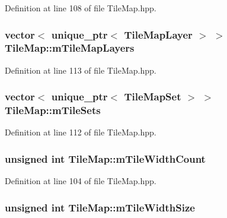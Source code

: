 Definition at line 108 of file Tile\-Map.\-hpp.

\hypertarget{class_tile_map_a954cc80053d31eab8a7950a36793f7b6}{
\subsubsection[{m\-Tile\-Map\-Layers}]{\setlength{\rightskip}{0pt plus 5cm}vector$<$ unique\-\_\-ptr$<$ {\bf Tile\-Map\-Layer} $>$ $>$ Tile\-Map\-::m\-Tile\-Map\-Layers\hspace{0.3cm}{\ttfamily [protected]}}}\label{class_tile_map_a954cc80053d31eab8a7950a36793f7b6}


Definition at line 113 of file Tile\-Map.\-hpp.

\hypertarget{class_tile_map_ae9003055f192d71c5b5f9032852214a2}{
\subsubsection[{m\-Tile\-Sets}]{\setlength{\rightskip}{0pt plus 5cm}vector$<$ unique\-\_\-ptr$<$ {\bf Tile\-Map\-Set} $>$ $>$ Tile\-Map\-::m\-Tile\-Sets\hspace{0.3cm}{\ttfamily [protected]}}}\label{class_tile_map_ae9003055f192d71c5b5f9032852214a2}


Definition at line 112 of file Tile\-Map.\-hpp.

\hypertarget{class_tile_map_aaee5f34ef457d19fa32768301ac81fc2}{
\subsubsection[{m\-Tile\-Width\-Count}]{\setlength{\rightskip}{0pt plus 5cm}unsigned int Tile\-Map\-::m\-Tile\-Width\-Count\hspace{0.3cm}{\ttfamily [protected]}}}\label{class_tile_map_aaee5f34ef457d19fa32768301ac81fc2}


Definition at line 104 of file Tile\-Map.\-hpp.

\hypertarget{class_tile_map_a98fe1a15d2a9fae5ecd3290fc9700661}{
\subsubsection[{m\-Tile\-Width\-Size}]{\setlength{\rightskip}{0pt plus 5cm}unsigned int Tile\-Map\-::m\-Tile\-Width\-Size\hspace{0.3cm}{\ttfamily [protected]}}}\label{class_tile_map_a98fe1a15d2a9fae5ecd3290fc9700661}


